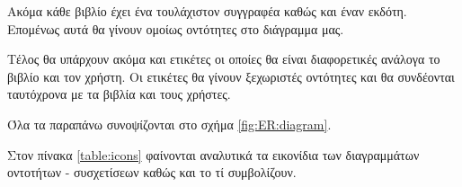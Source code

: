 \documentclass{assignment}
\begin{document}
Ακόμα κάθε βιβλίο έχει ένα τουλάχιστον συγγραφέα καθώς και έναν εκδότη. Επομένως αυτά θα γίνουν ομοίως οντότητες στο διάγραμμα μας.

Τέλος θα υπάρχουν ακόμα και ετικέτες οι οποίες θα είναι διαφορετικές ανάλογα το βιβλίο και τον χρήστη. Οι ετικέτες θα γίνουν ξεχωριστές οντότητες και θα συνδέονται ταυτόχρονα με τα βιβλία και τους χρήστες.

Όλα τα παραπάνω συνοψίζονται στο σχήμα \ref{fig:ER:diagram}.



Στον πίνακα \ref{table:icons} φαίνονται αναλυτικά τα εικονίδια των διαγραμμάτων οντοτήτων - συσχετίσεων καθώς και το τί συμβολίζουν.
\end{document}
